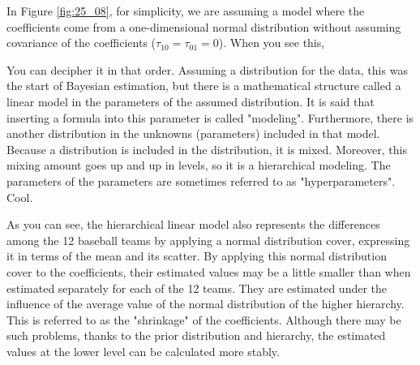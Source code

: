 \documentclass{ltjsbook}
\begin{document}
In Figure \ref{fig:25_08}, for simplicity, we are assuming a model where the coefficients come from a one-dimensional normal distribution without assuming covariance of the coefficients ($\tau_{10}=\tau_{01}=0$).
When you see this,

You can decipher it in that order.
Assuming a distribution for the data, this was the start of Bayesian estimation, but there is a mathematical structure called a linear model in the parameters of the assumed distribution. It is said that inserting a formula into this parameter is called "modeling". Furthermore, there is another distribution in the unknowns (parameters) included in that model. Because a distribution is included in the distribution, it is mixed. Moreover, this mixing amount goes up and up in levels, so it is a hierarchical modeling. The parameters of the parameters are sometimes referred to as "hyperparameters". Cool.

As you can see, the hierarchical linear model also represents the differences among the 12 baseball teams by applying a normal distribution cover, expressing it in terms of the mean and its scatter. By applying this normal distribution cover to the coefficients, their estimated values may be a little smaller than when estimated separately for each of the 12 teams. They are estimated under the influence of the average value of the normal distribution of the higher hierarchy. This is referred to as the "shrinkage" of the coefficients. Although there may be such problems, thanks to the prior distribution and hierarchy, the estimated values at the lower level can be calculated more stably.
\end{document}
